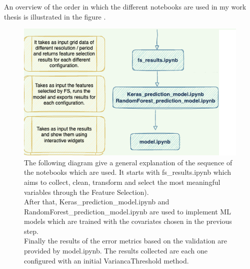 An overview of the order in which the different notebooks are used in my work thesis is illustrated in the figure .
\begin{figure}[H]
    \centering
    \includegraphics[scale=0.40]{images/overview _notebooks.png}
    \caption{The following diagram give a general explanation of the sequence of the notebooks which are used. It starts with fs\_results.ipynb which aims to collect, clean, transform and select the most meaningful variables through the Feature Selection). \\
    After that, Keras\_prediction\_model.ipynb and RandomForest\_prediction\_model.ipynb are used to implement ML models which are trained with the covariates chosen in the previous step. \\
    Finally the results of the error metrics based on the validation are provided by model.ipynb. 
    The results collected are each one configured with an initial VariancaThreshold method.}
    \label{fig:notebooks}
\end{figure}